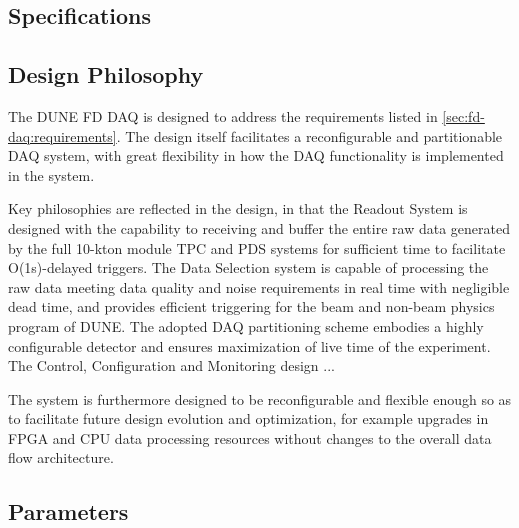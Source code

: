 
\subsection{Specifications}
\label{sec:sd-daq:specifications}




\subsection{Design Philosophy}

The DUNE FD DAQ is designed to address the requirements listed in
\ref{sec:fd-daq:requirements}. The design itself facilitates a
reconfigurable and partitionable DAQ system, with great flexibility in how
the DAQ functionality is implemented in the system. 

Key philosophies are reflected in the design, in that the Readout System is
designed with the capability to receiving and buffer the entire raw data generated by
the full 10-kton module TPC and PDS systems for sufficient time to
facilitate O(1s)-delayed triggers. The Data Selection system
is capable of processing the raw data meeting data quality and noise
requirements in real time with negligible dead time, and provides
efficient triggering for the beam and non-beam physics program of
DUNE. The adopted DAQ partitioning scheme embodies a highly configurable detector and ensures
maximization of live time of the experiment. The Control,
Configuration and Monitoring design ...

The system is furthermore designed to be reconfigurable and flexible
enough so as to facilitate future design evolution and optimization,
for example upgrades in FPGA and CPU data processing resources without changes to the
overall data flow architecture.

\subsection{Parameters}
\label{sec:sp-daq:parameters}

